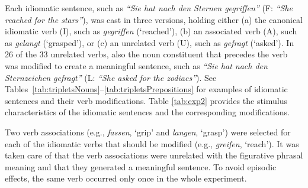 \documentclass[output=paper]{langsci/langscibook}
\begin{document}
Each idiomatic sentence, such as \textit{``Sie hat nach den Sternen gegriffen''} (F: \textit{``She reached for the stars''}), was cast in three versions, holding either (a) the canonical idiomatic verb (I), such as \textit{gegriffen} (‘reached’), (b) an associated verb (A), such as \textit{gelangt} (‘grasped’), or (c) an unrelated verb (U), such as \textit{gefragt} (‘asked’). In 26 of the 33 unrelated verbs, also the noun constituent that precedes the verb was modified to create a meaningful sentence, such as \textit{``Sie hat nach den Sternzeichen gefragt''} (L: \textit{``She asked for the zodiacs''}). See Tables~\ref{tab:tripletsNouns}--\ref{tab:tripletsPrepositions} for examples of idiomatic sentences and their verb modifications.  Table \ref{tab:exp2} provides the stimulus characteristics of the idiomatic sentences and the corresponding modifications.

\begin{table}
\caption{Idiomatic sentences and stimulus characteristics of the idiomatic, modified, and unrelated verb constituents in Experiment 2. \textit{Note.} N = number of items, Lemma = mean lemma frequency per one million, taken from CELEX \citep{baayen:1993}, Closure = mean sentence completion in \%.\label{tab:exp2}}
\end{table}

Two verb associations (e.g., \textit{fassen}, ‘grip’ and \textit{langen}, ‘grasp’) were selected for each of the idiomatic verbs that should be modified (e.g., \textit{greifen}, ‘reach’). It was taken care of that the verb associations were unrelated with the figurative phrasal meaning and that they generated a meaningful sentence. To avoid episodic effects, the same verb occurred only once in the whole experiment. 
\end{document}
